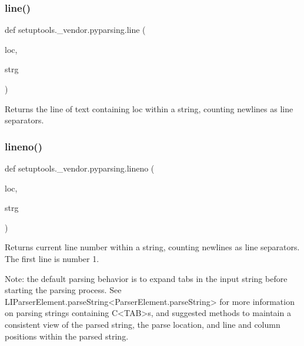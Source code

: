 \subsubsection{\texorpdfstring{line()}{line()}}
{\footnotesize\ttfamily def setuptools.\+\_\+vendor.\+pyparsing.\+line (\begin{DoxyParamCaption}\item[{}]{loc,  }\item[{}]{strg }\end{DoxyParamCaption})}

\begin{DoxyVerb}Returns the line of text containing loc within a string, counting newlines as line separators.\end{DoxyVerb}
 \mbox{\label{namespacesetuptools_1_1__vendor_1_1pyparsing_a31108ad3c6a3d4e149a97111151f0e2e}} 
\subsubsection{\texorpdfstring{lineno()}{lineno()}}
{\footnotesize\ttfamily def setuptools.\+\_\+vendor.\+pyparsing.\+lineno (\begin{DoxyParamCaption}\item[{}]{loc,  }\item[{}]{strg }\end{DoxyParamCaption})}

\begin{DoxyVerb}Returns current line number within a string, counting newlines as line separators.
   The first line is number 1.

   Note: the default parsing behavior is to expand tabs in the input string
   before starting the parsing process.  See L{I{ParserElement.parseString}<ParserElement.parseString>} for more information
   on parsing strings containing C{<TAB>}s, and suggested methods to maintain a
   consistent view of the parsed string, the parse location, and line and column
   positions within the parsed string.\end{DoxyVerb}
 \mbox{\label{namespacesetuptools_1_1__vendor_1_1pyparsing_a5bf80e004c259899048cb4b3e80480f8}} 
